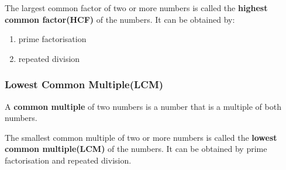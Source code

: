 \documentclass[../main]{subfiles}
\begin{document}
The largest common factor of two or more numbers is called the \textbf{highest
  common factor(HCF)} of the numbers. It can be obtained by: 
\begin{enumerate}
\item prime factorisation
  \item repeated division
\end{enumerate}

\subsubsection{Lowest Common Multiple(LCM)}
A \textbf{common multiple} of two numbers is a number that is a multiple of both
numbers.

The smallest common multiple of two or more numbers is called the \textbf{lowest
  common multiple(LCM)} of the numbers. It can be obtained by prime
factorisation and repeated division.
\end{document}
